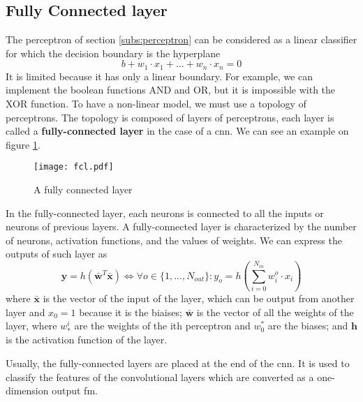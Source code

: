 \subsection{Fully Connected layer} \label{subs:fcl}
The perceptron of section \ref{subs:perceptron} can be considered as a linear classifier for which the decision boundary is the hyperplane
$$ b + w_1 \cdot x_1 + ... + w_n \cdot x_n = 0$$
It is limited because it has only a linear boundary. For example, we can implement the boolean functions AND and OR, but it is impossible with the XOR function. To have a non-linear model, we must use a topology of perceptrons. The topology is composed of layers of perceptrons, each layer is called a \textbf{fully-connected layer} in the case of a \acrshort{cnn}. We can see an example on figure \ref{fig:fcn}.
\begin{figure}
    \centering
    \texttt{[image: fcl.pdf]}
    \caption{A fully connected layer}
    \label{fig:fcn}
\end{figure}

In the fully-connected layer, each neurons is connected to all the inputs or neurons of previous layers. A fully-connected layer is characterized by the number of neurons, activation functions, and the values of weights. We can express the outputs of such layer as
$$
\boldsymbol{y} = h(\boldsymbol{\bar{w}}^T \boldsymbol{\bar{x}}) \Leftrightarrow \forall o \in \{ 1, ..., N_{out} \} : y_o = h(\sum^{N_{in}}_{i=0} w^o_i \cdot x_i)
$$
where $\boldsymbol{\bar{x}}$ is the vector of the input of the layer, which can be output from another layer and $x_0 = 1$ because it is the biaises;   $\boldsymbol{\bar{w}}$ is the vector of all the weights of the layer, where $w^i_*$ are the weights of the ith perceptron and $w^*_0$ are the biases; and $\boldsymbol{h}$ is the activation function of the layer.

Usually, the fully-connected layers are placed at the end of the \acrshort{cnn}. It is used to classify the features of the convolutional layers which are converted as a one-dimension output \acrshort{fm}.
